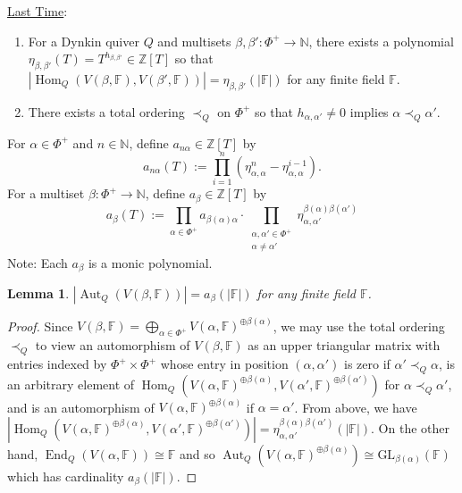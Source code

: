 \documentclass{book}
\newtheorem{lemma}[theorem]{Lemma}
\DeclareMathOperator{\Hom}{Hom}
\DeclareMathOperator{\End}{End}
\DeclareMathOperator{\Aut}{Aut}
\begin{document}
     
    
    \vspace{1cm} \underline{Last Time}: 
    \begin{enumerate}
        \item For a Dynkin quiver $Q$ and multisets $\beta,\beta':\Phi^+\to\mathbb{N}$, there exists a polynomial $\eta_{\beta,\beta'}(T)=T^{h_{\beta,\beta'}}\in\mathbb{Z}[T]$ so that $|\Hom_Q(V(\beta,\mathbb{F}),V(\beta',\mathbb{F}))|=\eta_{\beta,\beta'}(|\mathbb{F}|)$ for any finite field $\mathbb{F}$. 
        \item There exists a total ordering $\prec_Q$ on $\Phi^+$ so that $h_{\alpha,\alpha'}\neq 0$ implies $\alpha\prec_Q\alpha'$.
    \end{enumerate}
    
    For $\alpha\in\Phi^+$ and $n\in\mathbb{N}$, define $a_{n\alpha}\in\mathbb{Z}[T]$ by \[a_{n\alpha}(T):= \prod_{i=1}^n (\eta_{\alpha,\alpha}^n-\eta_{\alpha,\alpha}^{i-1}).\]
    For a multiset  $\beta:\Phi^+\to\mathbb{N}$, define $a_\beta\in\mathbb{Z}[T]$ by \[a_{\beta}(T):= \prod_{\alpha\in\Phi^+}a_{\beta(\alpha)\alpha}\cdot\prod_{\substack{\alpha,\alpha'\in\Phi^+ \\ \alpha\neq\alpha'}}\eta_{\alpha,\alpha'}^{\beta(\alpha)\beta(\alpha')}\]
    Note: Each $a_\beta$ is a monic polynomial. 
    
    \begin{lemma}
        $|\Aut_Q(V(\beta,\mathbb{F}))|=a_\beta(|\mathbb{F}|)$ for any finite field $\mathbb{F}$.
    \end{lemma}
    
    \begin{proof}
        Since $V(\beta,\mathbb{F})=\bigoplus_{\alpha\in\Phi^+}V(\alpha,\mathbb{F})^{\oplus\beta(\alpha)}$, we may use the total ordering $\prec_Q$ to view an automorphism of $V(\beta,\mathbb{F})$ as an upper triangular matrix with entries indexed by $\Phi^+\times\Phi^+$ whose entry in position $(\alpha,\alpha')$ is zero if $\alpha'\prec_Q\alpha$, is an arbitrary element of $\Hom_Q(V(\alpha,\mathbb{F})^{\oplus\beta(\alpha)},V(\alpha',\mathbb{F})^{\oplus\beta(\alpha')})$ for $\alpha\prec_Q\alpha'$, and is an automorphism of $V(\alpha,\mathbb{F})^{\oplus\beta(\alpha)}$ if $\alpha=\alpha'$. From above, we have $|\Hom_Q(V(\alpha,\mathbb{F})^{\oplus\beta(\alpha)},V(\alpha',\mathbb{F})^{\oplus\beta(\alpha')})|=\eta_{\alpha,\alpha'}^{\beta(\alpha)\beta(\alpha')}(|\mathbb{F}|).$ On the other hand, $\End_Q(V(\alpha,\mathbb{F}))\cong\mathbb{F}$ and so $\Aut_Q(V(\alpha,\mathbb{F})^{\oplus\beta(\alpha)})\cong\text{GL}_{\beta(\alpha)}(\mathbb{F})$ which has cardinality $a_\beta(|\mathbb{F}|)$.
    \end{proof}
    
\end{document}
